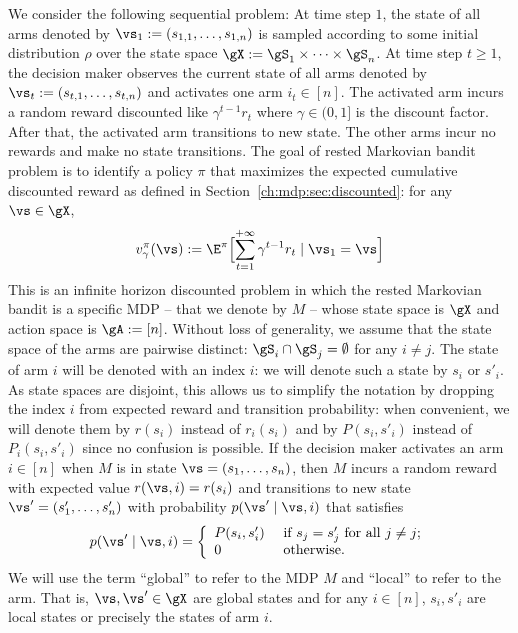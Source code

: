 We consider the following sequential problem: At time step $1$, the state of all arms denoted by $\vs_1:=(s_{1,1},\dots,s_{1,n})$ is sampled according to some initial distribution $\rho$ over the state space $\gX:=\gS_1\times\dots\times\gS_n$.
At time step $t\ge1$, the decision maker observes the current state of all arms denoted by $\vs_t:=(s_{t,1},\dots,s_{t,n})$ and activates one arm $i_t\in[n]$.
The activated arm incurs a random reward discounted like $\gamma^{t-1}r_t$ where $\gamma\in(0,1]$ is the discount factor.
After that, the activated arm transitions to new state. %
The other arms incur no rewards and make no state transitions. %
The goal of rested Markovian bandit problem is to identify a policy $\pi$ that maximizes the expected cumulative discounted reward as defined in Section~\ref{ch:mdp:sec:discounted}: for any $\vs\in\gX$,
\begin{equation}
    \label{ch:mb:value}
    v_\gamma^\pi(\vs):=\E^\pi\Bigl[\sum_{t=1}^{+\infty} \gamma^{t-1}r_t \mid \vs_1=\vs\Bigr]
\end{equation}
This is an infinite horizon discounted problem in which the rested Markovian bandit is a specific MDP -- that we denote by $M$ -- whose state space is $\gX$ and action space is $\gA:=[n]$.
Without loss of generality, we assume that the state space of the arms are pairwise distinct: $\gS_i\cap\gS_j=\emptyset$ for any $i\neq j$.
The state of arm $i$ will be denoted with an index $i$: we will denote such a state by $s_i$ or $s'_i$.
As state spaces are disjoint, this allows us to simplify the notation by dropping the index $i$ from expected reward and transition probability: when convenient, we will denote them by $r(s_i)$ instead of $r_i(s_i)$ and by $P(s_i,s'_i)$ instead of $P_i(s_i,s'_i)$ since no confusion is possible.
If the decision maker activates an arm $i\in[n]$ when $M$ is in state $\vs=(s_1,\dots,s_n)$, then $M$ incurs a random reward with expected value $r(\vs,i)=r(s_i)$ and transitions to new state $\vs'=(s'_1,\dots,s'_n)$ with probability $p(\vs'\mid \vs, i)$ that satisfies
\begin{equation}
    \label{ch:mb:P_defn}
    p(\vs'\mid \vs, i)
    = 
    \left\{
        \begin{array}{ll}
            P(s_i,s'_i) & \text{ if $s_j=s'_j$ for all $j\ne j$;}\\
            0 &\text{ otherwise}.
        \end{array}
    \right.
\end{equation}
We will use the term ``global'' to refer to the MDP $M$ and ``local'' to refer to the arm.
That is, $\vs, \vs'\in\gX$ are global states and for any $i\in[n]$, $s_i,s'_i$ are local states or precisely the states of arm $i$.

